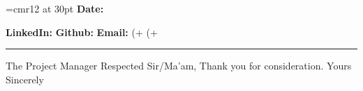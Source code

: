 \documentclass{article}
\begin{document}
    
    \title{}
    
    \noindent
    \begin{minipage}[c]{0.7 \linewidth}
        \font\myfont=cmr12 at 30pt
            {\flushleft{
                            \myfont{%
									\newline \newline }}
                            \textbf{Date:} %
                        }
    \end{minipage}
    \begin{minipage}[c]{0.3 \linewidth}
        \begin{flushright}
            \mbox{}\hfill \textbf{LinkedIn:} %
			\newline
            \mbox{}\hfill \textbf{Github:} %
			\newline
            \mbox{}\hfill \textbf{Email:} %
			\newline
            \mbox{}\hfill (+%
			\newline
            \mbox{}\hfill (+%
			\newline
        \end{flushright}
    \end{minipage}
    
    \hrule
    \newline
    
    \begin{flushleft}
        The Project Manager 
		\newline
		\newline
		\newline
        \newline
        Respected Sir/Ma'am,
        \newline\newline
        \newline\newline
        \newline\newline
        \newline\newline
        \newline\newline
        \newline\newline
        Thank you for consideration.
        \newline
        Yours Sincerely
        \newline\
    
    \end{flushleft}
        
\end{document}

